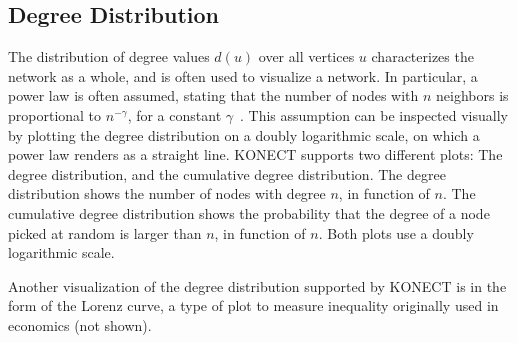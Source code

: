 \documentclass{article}
\begin{document}
\subsection{Degree Distribution} 
\label{sec:plot:degree}
The distribution of degree values $d(u)$ over all vertices $u$
characterizes the network as a whole, and is often used to visualize a
network. In particular, a power law is often assumed, stating that the
number of nodes with $n$ neighbors is proportional to $n^{-\gamma}$, for
a constant $\gamma$~\cite{b439}. This assumption can be inspected
visually by plotting the degree distribution on a doubly logarithmic
scale, on which a power law renders as a straight line.  KONECT supports
two different plots: The degree distribution, and the cumulative degree
distribution. The degree distribution shows the number of nodes with
degree $n$, in function of $n$.  The cumulative degree distribution
shows the probability that the degree of a node picked at random is
larger than $n$, in function of $n$. Both plots use a doubly logarithmic
scale.

Another visualization of the degree distribution supported by KONECT is
in the form of the Lorenz curve, a type of plot to measure inequality
originally used in economics (not shown).
\end{document}
